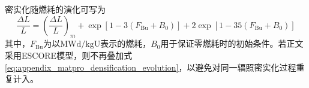密实化随燃耗的演化可写为
\begin{equation}
	\frac{\Delta L}{L}
	=\left(\frac{\Delta L}{L}\right)_m
	+\exp\!\left[1-3(F_{\mathrm{Bu}}+B_0)\right]
	+2\exp\!\left[1-35(F_{\mathrm{Bu}}+B_0)\right]
	\label{eq:appendix_matpro_densification_evolution}
\end{equation}
其中，$F_{\mathrm{Bu}}$为以$\mathrm{MWd/kgU}$表示的燃耗，$B_0$用于保证零燃耗时的初始条件。若正文采用ESCORE模型，则不再叠加式\eqref{eq:appendix_matpro_densification_evolution}，以避免对同一辐照密实化过程重复计入。
